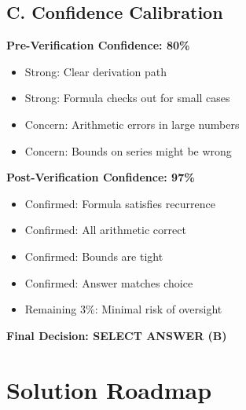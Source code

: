 \documentclass[12pt]{article}
\begin{document}
\begin{verificationbox}
\subsection*{C. Confidence Calibration}

\textbf{Pre-Verification Confidence: 80\%}
\begin{itemize}
    \item Strong: Clear derivation path
    \item Strong: Formula checks out for small cases
    \item Concern: Arithmetic errors in large numbers
    \item Concern: Bounds on series might be wrong
\end{itemize}

\textbf{Post-Verification Confidence: 97\%}
\begin{itemize}
    \item Confirmed: Formula satisfies recurrence
    \item Confirmed: All arithmetic correct
    \item Confirmed: Bounds are tight
    \item Confirmed: Answer matches choice
    \item Remaining 3\%: Minimal risk of oversight
\end{itemize}

\textbf{Final Decision: SELECT ANSWER (B)}

\end{verificationbox}

\section{Solution Roadmap}
\end{document}
